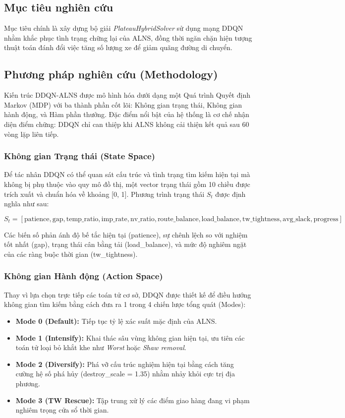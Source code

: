 \documentclass[13pt, a4paper]{extarticle} %
\begin{document}
\subsection{Mục tiêu nghiên cứu}
Mục tiêu chính là xây dựng bộ giải \textit{PlateauHybridSolver} sử dụng mạng DDQN nhằm khắc phục tình trạng chững lại của ALNS, đồng thời ngăn chặn hiện tượng thuật toán đánh đổi việc tăng số lượng xe để giảm quãng đường di chuyển.

\subsection{Phương pháp nghiên cứu (Methodology)}

Kiến trúc DDQN-ALNS được mô hình hóa dưới dạng một Quá trình Quyết định Markov (MDP) với ba thành phần cốt lõi: Không gian trạng thái, Không gian hành động, và Hàm phần thưởng. Đặc điểm nổi bật của hệ thống là cơ chế nhận diện điểm chững: DDQN chỉ can thiệp khi ALNS không cải thiện kết quả sau 60 vòng lặp liên tiếp.

\subsubsection{Không gian Trạng thái (State Space)}
Để tác nhân DDQN có thể quan sát cấu trúc và tình trạng tìm kiếm hiện tại mà không bị phụ thuộc vào quy mô đồ thị, một vector trạng thái gồm 10 chiều được trích xuất và chuẩn hóa về khoảng [0, 1]. Phương trình trạng thái $S_t$ được định nghĩa như sau:

\[
S_t = \left[ \text{patience}, \text{gap}, \text{temp\_ratio}, \text{imp\_rate}, \text{nv\_ratio}, \text{route\_balance}, \text{load\_balance}, \text{tw\_tightness}, \text{avg\_slack}, \text{progress} \right]
\]

Các biến số phản ánh độ bế tắc hiện tại (patience), sự chênh lệch so với nghiệm tốt nhất (gap), trạng thái cân bằng tải (load\_balance), và mức độ nghiêm ngặt của các ràng buộc thời gian (tw\_tightness).

\subsubsection{Không gian Hành động (Action Space)}
Thay vì lựa chọn trực tiếp các toán tử cơ sở, DDQN được thiết kế để điều hướng không gian tìm kiếm bằng cách đưa ra 1 trong 4 chiến lược tổng quát (Modes):
\begin{itemize}
    \item \textbf{Mode 0 (Default):} Tiếp tục tỷ lệ xác suất mặc định của ALNS.
    \item \textbf{Mode 1 (Intensify):} Khai thác sâu vùng không gian hiện tại, ưu tiên các toán tử loại bỏ khắt khe như \textit{Worst} hoặc \textit{Shaw removal}.
    \item \textbf{Mode 2 (Diversify):} Phá vỡ cấu trúc nghiệm hiện tại bằng cách tăng cường hệ số phá hủy (destroy\_scale = 1.35) nhằm nhảy khỏi cực trị địa phương.
    \item \textbf{Mode 3 (TW Rescue):} Tập trung xử lý các điểm giao hàng đang vi phạm nghiêm trọng cửa sổ thời gian.
\end{itemize}
\end{document}
